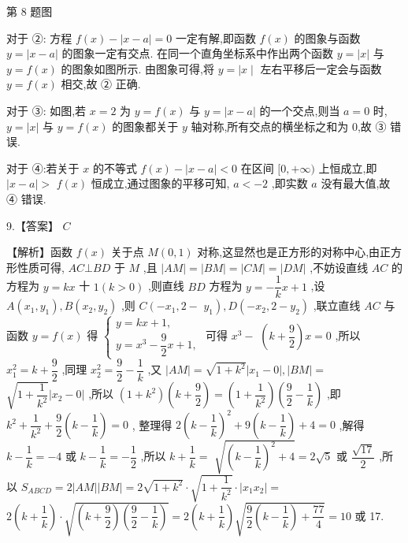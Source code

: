 \documentclass[10pt]{article}
\begin{document}
第 8 题图

对于 ②: 方程 $f\left( x\right)  - \left| {x - a}\right|  = 0$ 一定有解,即函数 $f\left( x\right)$ 的图象与函数 $y = \left| {x - a}\right|$ 的图象一定有交点. 在同一个直角坐标系中作出两个函数 $y = \left| x\right|$ 与 $y = f\left( x\right)$ 的图象如图所示. 由图象可得,将 $y =  \mid  x \mid$ 左右平移后一定会与函数 $y = f\left( x\right)$ 相交,故 ② 正确.

对于 ③: 如图,若 $x = 2$ 为 $y = f\left( x\right)$ 与 $y = \left| {x - a}\right|$ 的一个交点,则当 $a = 0$ 时, $y = \left| x\right|$ 与 $y = f\left( x\right)$ 的图象都关于 $y$ 轴对称,所有交点的横坐标之和为 0,故 ③ 错误.

对于 ④:若关于 $x$ 的不等式 $f\left( x\right)  - \left| {x - a}\right|  < 0$ 在区间 $\lbrack 0, + \infty )$ 上恒成立,即 $\left| {x - a}\right|  >$  $f\left( x\right)$ 恒成立,通过图象的平移可知, $a <  - 2$ ,即实数 $a$ 没有最大值,故 ④ 错误.

9.【答案】 ${C}$

【解析】函数 $f\left( x\right)$ 关于点 $M\left( {0,1}\right)$ 对称,这显然也是正方形的对称中心,由正方形性质可得, ${AC} \bot  {BD}$ 于 $M$ ,且 $\left| {AM}\right|  = \left| {BM}\right|  = \left| {CM}\right|  = \left| {DM}\right|$ ,不妨设直线 ${AC}$ 的方程为 $y = {kx}$ 十 $1\left( {k > 0}\right)$ ,则直线 ${BD}$ 方程为 $y =  - \dfrac{1}{k}x + 1$ ,设 $A\left( {{x}_{1},{y}_{1}}\right) ,B\left( {{x}_{2},{y}_{2}}\right)$ ,则 $C\left( {-{x}_{1},2 - }\right.$  $\left. {y}_{1}\right) ,D\left( {-{x}_{2},2 - {y}_{2}}\right)$ ,联立直线 ${AC}$ 与函数 $y = f\left( x\right)$ 得 $\left\{  \begin{array}{l} y = {kx} + 1, \\  y = {x}^{3} - \dfrac{9}{2}x + 1, \end{array}\right.$ 可得 ${x}^{3} -$  $\left( {k + \dfrac{9}{2}}\right) x = 0$ ,所以 ${x}_{1}^{2} = k + \dfrac{9}{2}$ ,同理 ${x}_{2}^{2} = \dfrac{9}{2} - \dfrac{1}{k}$ ,又 $\left| {AM}\right|  = \sqrt{1 + {k}^{2}}\left| {{x}_{1} - 0}\right| ,\left| {BM}\right|  =$  $\sqrt{1 + \dfrac{1}{{k}^{2}}}\left| {{x}_{2} - 0}\right|$ ,所以 $\left( {1 + {k}^{2}}\right) \left( {k + \dfrac{9}{2}}\right)  = \left( {1 + \dfrac{1}{{k}^{2}}}\right) \left( {\dfrac{9}{2} - \dfrac{1}{k}}\right)$ ,即 ${k}^{2} + \dfrac{1}{{k}^{2}} + \dfrac{9}{2}\left( {k - \dfrac{1}{k}}\right)  = 0$ , 整理得 $2{\left( k - \dfrac{1}{k}\right) }^{2} + 9\left( {k - \dfrac{1}{k}}\right)  + 4 = 0$ ,解得 $k - \dfrac{1}{k} =  - 4$ 或 $k - \dfrac{1}{k} =  - \dfrac{1}{2}$ ,所以 $k + \dfrac{1}{k} =$  $\sqrt{{\left( k - \dfrac{1}{k}\right) }^{2} + 4} = 2\sqrt{5}$ 或 $\dfrac{\sqrt{17}}{2}$ ,所以 ${S}_{ABCD} = 2\left| {AM}\right| \left| {BM}\right|  = 2\sqrt{1 + {k}^{2}} \cdot  \sqrt{1 + \dfrac{1}{{k}^{2}}} \cdot  \left| {{x}_{1}{x}_{2}}\right|  =$  $2\left( {k + \dfrac{1}{k}}\right)  \cdot  \sqrt{\left( {k + \dfrac{9}{2}}\right) \left( {\dfrac{9}{2} - \dfrac{1}{k}}\right) } = 2\left( {k + \dfrac{1}{k}}\right) \sqrt{\dfrac{9}{2}\left( {k - \dfrac{1}{k}}\right)  + \dfrac{77}{4}} = {10}$ 或 17.
\end{document}
